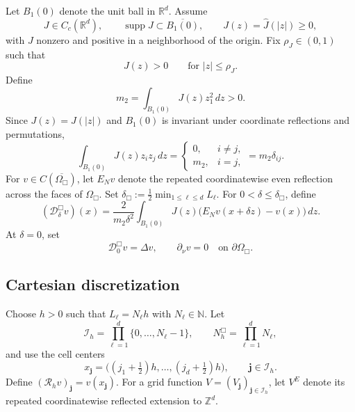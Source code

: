 \documentclass[11pt]{article}
\theoremstyle{definition}
\newcommand{\R}{\mathbb{R}}
\newcommand{\Z}{\mathbb{Z}}
\newcommand{\cD}{\mathcal{D}}
\newcommand{\cR}{\mathcal{R}}
\newcommand{\jj}{\bm j}
\begin{document}
Let $B_1(0)$ denote the unit ball in $\R^d$.  Assume
\[
 J\in C_c(\R^d),\qquad
 \operatorname{supp}J\subset\overline{B_1(0)},
 \qquad
 J(z)=\widehat J(|z|)\ge0,
\]
with $J$ nonzero and positive in a neighborhood of the origin.  Fix
$\rho_J\in(0,1)$ such that
\begin{equation}
\label{eq:J-positive-ball}
 J(z)>0
 \qquad\text{for }|z|\le\rho_J.
\end{equation}
Define
\begin{equation}
\label{eq:m2}
 m_2
 =
 \int_{B_1(0)}J(z)z_1^2\,dz>0.
\end{equation}
Since $J(z)=J(|z|)$ and $B_1(0)$ is invariant under coordinate
reflections and permutations,
\begin{equation}
\label{eq:kernel-second-moment}
 \int_{B_1(0)}J(z)z_i z_j\,dz
 =
 \begin{cases}
  0, & i\ne j,\\
  m_2, & i=j,
 \end{cases}
 =
 m_2\delta_{ij}.
\end{equation}
For $v\in C(\overline{\Omega_{\Box}})$, let $E_Nv$ denote the repeated coordinatewise even reflection across the faces of $\Omega_{\Box}$.  Set $\delta_{\Box}:=\frac12\min_{1\le\ell\le d}L_\ell$.  For $0<\delta\le\delta_{\Box}$, define
\begin{equation}
\label{eq:nonlocal-op}
 (\cD_\delta^{\Box}v)(x)
 =
 \frac{2}{m_2\delta^2}
 \int_{B_1(0)}
 J(z)\big(E_Nv(x+\delta z)-v(x)\big)\,dz.
\end{equation}
At $\delta=0$, set
\begin{equation}
\label{eq:local-op}
 \cD_0^{\Box}v=\Delta v,
 \qquad
 \partial_\nu v=0\quad\text{on }\partial\Omega_{\Box}.
\end{equation}

\subsection{Cartesian discretization}

Choose $h>0$ such that $L_\ell=N_\ell h$ with $N_\ell\in\mathbb N$.  Let
\[
 \mathcal I_h
 =
 \prod_{\ell=1}^{d}\{0,\ldots,N_\ell-1\},
 \qquad
 N_h^{\Box}
 =
 \prod_{\ell=1}^{d}N_\ell,
\]
and use the cell centers
\[
 x_{\jj}
 =
 \big((j_1+\tfrac12)h,\ldots,(j_d+\tfrac12)h\big),
 \qquad
 \jj\in\mathcal I_h.
\]
Define $(\cR_hv)_{\jj}=v(x_{\jj})$.  For a grid function $V=(V_{\jj})_{\jj\in\mathcal I_h}$, let $V^E$ denote its repeated coordinatewise reflected extension to $\Z^d$.
\end{document}
